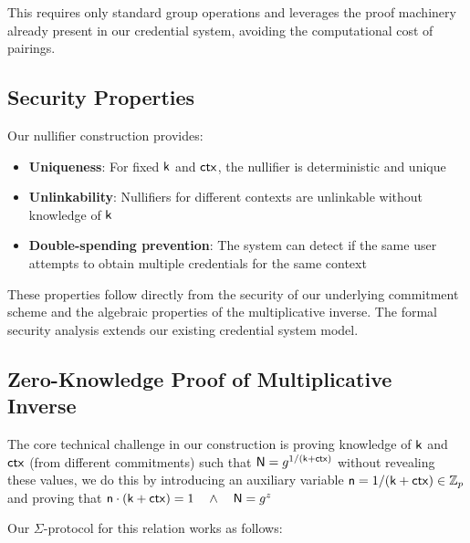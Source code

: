 This requires only standard group operations and leverages the proof machinery already present in our credential system, avoiding the computational cost of pairings.











\subsection{Security Properties}
Our nullifier construction provides:

\begin{itemize}
    \item \textbf{Uniqueness}: For fixed $\mathsf{k}$ and $\mathsf{ctx}$, the nullifier is deterministic and unique
    \item \textbf{Unlinkability}: Nullifiers for different contexts are unlinkable without knowledge of $\mathsf{k}$
    \item \textbf{Double-spending prevention}: The system can detect if the same user attempts to obtain multiple credentials for the same context
\end{itemize}

These properties follow directly from the security of our underlying commitment scheme and the algebraic properties of the multiplicative inverse. The formal security analysis extends our existing credential system model.



\subsection{Zero-Knowledge Proof of Multiplicative Inverse}
The core technical challenge in our construction is proving knowledge of $\mathsf{k}$ and $\mathsf{ctx}$ (from different commitments) such that $\mathsf{N} = g^{1/(\mathsf{k} + \mathsf{ctx})}$ without revealing these values, we do this by introducing an auxiliary variable $\mathsf{n} = 1/(\mathsf{k} + \mathsf{ctx}) \in \mathbb{Z}_p$ and proving that $\mathsf{n} \cdot (\mathsf{k} + \mathsf{ctx}) = 1 \quad \wedge \quad \mathsf{N} = g^z$

Our $\Sigma$-protocol for this relation works as follows:

